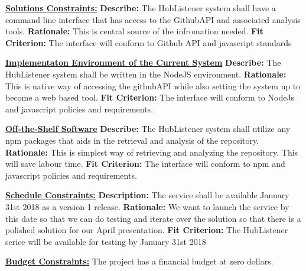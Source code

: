 \documentclass{article}
\begin{document}
\noindent
\textbf{\underline{Solutions Constraints:}}\newline
\textbf{Describe:}  The HubListener system shall have a command line interface that has access to the GithubAPI and associated analysis tools.\newline
\textbf{Rationale:} This is central source of the infromation needed. \newline
\textbf{Fit Criterion:}  The interface will conform to Github API and javascript standards \newline

\noindent
\textbf{\underline{Implementaton Environment of the Current System}}\newline
\textbf{Describe:}  The HubListener system shall be written in the NodeJS environment.\newline
\textbf{Rationale:} This is native way of accessing the githubAPI while also setting the system up to become a web based tool.\newline 
\textbf{Fit Criterion:}  The interface will conform to NodeJs and javascript policies and requirements. \newline

\noindent
\textbf{\underline{Off-the-Shelf Software}}\newline
\textbf{Describe:}  The HubListener system shall utilize any npm packages that aids in the retrieval and analysis of the repository. \newline
\textbf{Rationale:}  This is simplest way of retrieving and analyzing the repository. This will save labour time.\newline
\textbf{Fit Criterion:}  The interface will conform to npm and javascript policies and requirements. \newline

\noindent
\textbf{\underline{Schedule Constraints:}}\newline
\textbf{Description:} The service shall be available January 31st 2018 as a version 1 release.\newline
\textbf{Rationale:} We want to launch the service by this date so that we can do testing and iterate over the solution so that there is a polished solution for our April presentation.\newline
\textbf{Fit Criterion:} The HubListener serice will be available for testing by January 31st 2018 \newline

\noindent
\textbf{\underline{Budget Constraints:}} 
The project has a financial budget at zero dollars. 
\newpage
\end{document}
